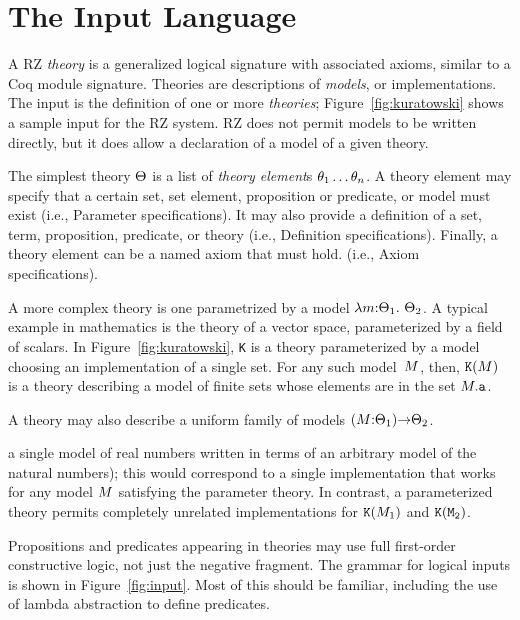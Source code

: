 
\section{The Input Language}
\label{sec:input-language}

A RZ \emph{theory} is a generalized logical signature with associated
axioms, similar to a Coq module signature. Theories are descriptions
of \emph{models}, or implementations. The input is the definition of
one or more \emph{theories}; Figure~\ref{fig:kuratowski} shows a
sample input for the RZ system. RZ does not permit models to be
written directly, but it does allow a declaration of a model of a
given theory.

The simplest theory $\Theta$ is a list of \emph{theory element}\/s
$\theta_1 \ldots \theta_n$. A theory element may specify that a certain
set, set element, proposition or predicate, or model must exist (i.e.,
\textsf{Parameter} specifications). It may also provide a definition
of a set, term, proposition, predicate, or theory (i.e.,
\textsf{Definition} specifications). Finally, a theory element can be
a named axiom that must hold. (i.e., \textsf{Axiom} specifications).

A more complex theory is one parametrized by a model
$\lambda m{:}\Theta_1.\ \Theta_2$. A typical example in mathematics is
the theory of a vector space, parameterized by a field of scalars. In
Figure~\ref{fig:kuratowski}, \texttt{K} is a theory parameterized by a
model choosing an implementation of a single set. For any such
model~$M$, then, $\mathtt{K}(M)$ is a theory describing a model of
finite sets whose elements are in the set $M{.}\mathtt{a}$.

A theory may also describe a uniform family of models
$(M{:}\Theta_1){\to}\Theta_2$. 


a single model of real numbers written in terms of an arbitrary model
of the natural numbers); this would correspond to a single
implementation that works for any model $M$ satisfying the parameter
theory. In contrast, a parameterized theory permits completely
unrelated implementations for $\mathtt{K}(M_1)$ and
$\mathtt{K(M_2)}$.

Propositions and predicates appearing in theories may use full
first-order constructive logic, not just the negative fragment. The
grammar for logical inputs is shown in Figure~\ref{fig:input}. Most of
this should be familiar, including the use of lambda abstraction to
define predicates.


